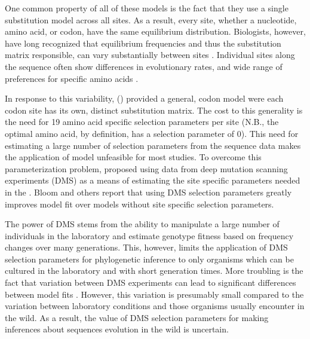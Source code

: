 \documentclass[12pt]{article}
\begin{document}
One common property of all of these models is the fact that they use a single substitution model across all sites. As a result, every site, whether a nucleotide,  amino acid, or codon, have the same equilibrium distribution.
Biologists, however, have long recognized that equilibrium frequencies and thus the substitution matrix responsible, can vary substantially between sites \citep{felsenstein1981, gojobori1983}.
Individual sites along the sequence often show differences in evolutionary rates, and wide range of preferences for specific amino acids \citep{ashenberg2013, echave2016}.

In response to this variability, \citet{HalpernAndBruno1998} (\hb) provided a general, codon model were each codon site has its own, distinct substitution matrix.
The cost to this generality is the need for 19 amino acid specific selection parameters per site (N.B., the optimal amino acid, by definition, has a selection parameter of 0).
This need for estimating a large number of selection parameters from the sequence data makes the application of \citet{HalpernAndBruno1998} model unfeasible for most studies.
To overcome this parameterization problem,\citet{bloom2014} proposed using data from deep mutation scanning experiments (DMS) as a means of estimating the site specific parameters needed in the \citet{HalpernAndBruno1998}.
Bloom and others \citep{bloom2014, bloom2017, hilton2017} report that using DMS selection parameters greatly improves model fit over models without site specific selection parameters.

The power of DMS stems from the ability to manipulate a large number of individuals in the laboratory and estimate genotype fitness based on frequency changes over many generations.
This, however, limits the application of DMS selection parameters for phylogenetic inference to only organisms which can be cultured in the laboratory and with short generation times.
More troubling is the fact that variation between DMS experiments can lead to significant differences between model fits \citep{hilton2017}.
However, this variation is presumably small compared to the variation between laboratory conditions and those organisms usually encounter in the wild.
As a result, the value of DMS selection parameters for making inferences about sequences evolution in the wild is uncertain.
\end{document}
